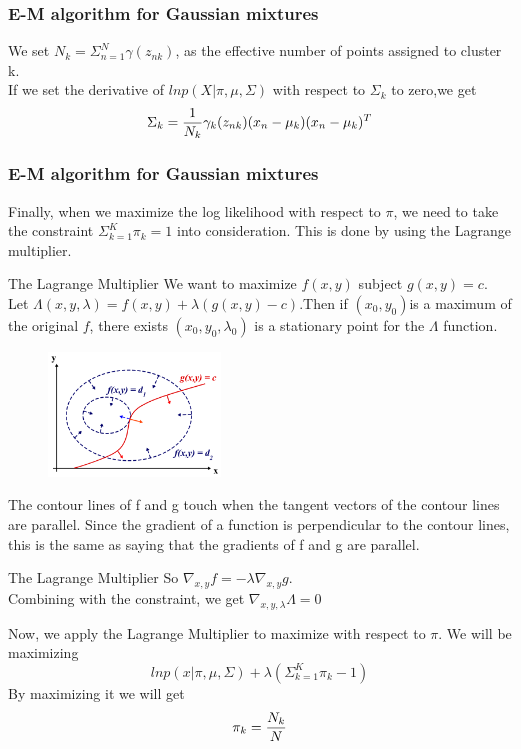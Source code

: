 \documentclass{beamer}
\begin{document}
\begin{frame}
\frametitle{E-M algorithm for Gaussian mixtures}
We set $N_k=\Sigma^{N}_{n=1}\gamma(z_{nk})$, as the effective number of points assigned to cluster k.\\
If we set the derivative of $lnp(X|\pi,\mu,\Sigma)$ with respect to $\Sigma_k$ to zero,we get
\begin{equation}{\label{m2}}
\Sigma_k=\frac{1}{N_k}\gamma_k(z_{nk})(x_n-\mu_k)(x_n-\mu_k)^T
\end{equation}
\end{frame}


\begin{frame}
\frametitle{E-M algorithm for Gaussian mixtures}
Finally, when we maximize the log likelihood with respect to $\pi$, we need to take the constraint $\Sigma_{k=1}^K\pi_k=1$ into consideration.
This is done by using the Lagrange multiplier.
\end{frame}

\begin{frame}
\begin{block}{The Lagrange Multiplier}
We want to maximize $f(x,y)$ subject $g(x,y) = c$.\\
Let $\Lambda(x, y, \lambda) = f(x,y) + \lambda (g(x,y)-c)$.Then if $(x_0, y_0)$is a maximum of the original $f$, there exists $(x_0,y_0,\lambda_0)$ is a stationary point for the $\Lambda$ function.\\
\begin{figure}[L]
\includegraphics[width=130pt]{Lagrange.png}
\end{figure}
The contour lines of f and g touch when the tangent vectors of the contour lines are parallel. Since the gradient of a function is perpendicular to the contour lines, this is the same as saying that the gradients of f and g are parallel. 
\end{block}
\end{frame}

\begin{frame}
\begin{block}{The Lagrange Multiplier}
So $\nabla_{x,y}f =  - \lambda \nabla_{x,y}g$.\\
Combining with the constraint, we get $\nabla_{x,y,\lambda}\Lambda = 0$
\end{block}
Now, we apply the Lagrange Multiplier to maximize with respect to $\pi$. We will be maximizing
\begin{equation}
lnp(x|\pi,\mu,\Sigma)+\lambda(\Sigma_{k=1}^K\pi_k-1)
\end{equation}
By maximizing it we will get 
\begin{equation}{\label{m3}}
\pi_k=\frac{N_k}{N}
\end{equation}
\end{frame}
\end{document}
